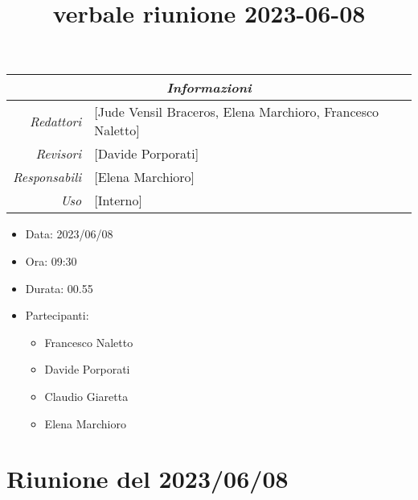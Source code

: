 \documentclass[12pt]{article}
\begin{document}
\graphicspath{ {../../templates/img} }

\title{verbale riunione 2023-06-08}

\firstPage
\maketitle

\begin{center}
\begin{tabular}{r | l}
    \multicolumn{2}{c}{\textit{Informazioni}}\\
    \hline
    
        \textit{Redattori} &
        [Jude Vensil Braceros, Elena Marchioro, Francesco Naletto]\makecell{}\\
    
        \textit{Revisori} &
        [Davide Porporati]\makecell{}\\
        \textit{Responsabili} &
        [Elena Marchioro]\makecell{}\\
            \textit{Uso} & 
            [Interno]\makecell{}\\
\end{tabular}
    \begin{itemize}
    \item[] Data: 2023/06/08
    \item[] Ora: 09:30
    \item[] Durata: 00.55
    \item[] Partecipanti:
    \begin{itemize}
    \item[] Francesco Naletto
    \item[] Davide Porporati
    \item[] Claudio Giaretta
    \item[] Elena Marchioro
    \end{itemize}
\end{itemize}
\end{center}


\tableofcontents
\printindex 
\section{Riunione del 2023/06/08}
\end{document}
